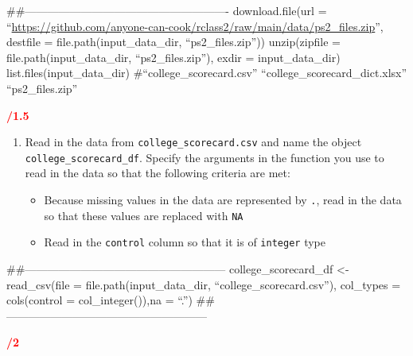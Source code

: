 \documentclass[
]{article}
\providecommand{\tightlist}{%
  \setlength{\itemsep}{0pt}\setlength{\parskip}{0pt}}
\begin{document}
\#\#-------------------------------------------------------
download.file(url =
``\url{https://github.com/anyone-can-cook/rclass2/raw/main/data/ps2_files.zip}'',
destfile = file.path(input\_data\_dir, ``ps2\_files.zip''))
unzip(zipfile = file.path(input\_data\_dir, ``ps2\_files.zip''), exdir =
input\_data\_dir) list.files(input\_data\_dir)
\#``college\_scorecard.csv'' ``college\_scorecard\_dict.xlsx''
``ps2\_files.zip''

\textcolor{red}{\textbf{/1.5}}

\begin{enumerate}
\def\labelenumi{\arabic{enumi}.}
\setcounter{enumi}{2}
\item
  Read in the data from \texttt{college\_scorecard.csv} and name the
  object \texttt{college\_scorecard\_df}. Specify the arguments in the
  function you use to read in the data so that the following criteria
  are met:

  \begin{itemize}
  \tightlist
  \item
    Because missing values in the data are represented by
    \texttt{\textquotesingle{}.\textquotesingle{}}, read in the data so
    that these values are replaced with \texttt{NA}
  \item
    Read in the \texttt{control} column so that it is of
    \texttt{integer} type
  \end{itemize}
\end{enumerate}

\#\#------------------------------------------------------
college\_scorecard\_df \textless- read\_csv(file =
file.path(input\_data\_dir, ``college\_scorecard.csv''), col\_types =
cols(control = col\_integer()),na = ``.'')
\#\#------------------------------------------------------

\textcolor{red}{\textbf{/2}}
\end{document}
